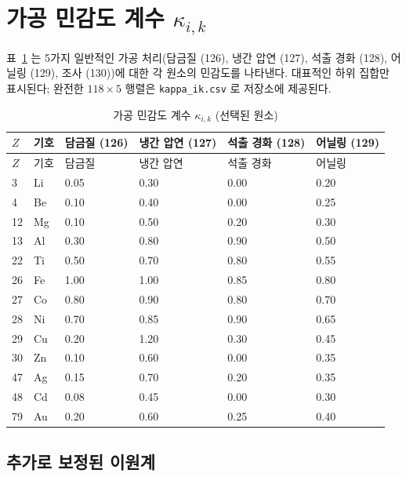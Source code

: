 \documentclass[12pt,a4paper]{article}
\begin{document}
	\section{가공 민감도 계수 $\kappa_{i,k}$}
	표~\ref{tab:kappa_ik} 는 5가지 일반적인 가공 처리(담금질 (126), 냉간 압연 (127), 석출 경화 (128), 어닐링 (129), 조사 (130))에 대한 각 원소의 민감도를 나타낸다. 대표적인 하위 집합만 표시된다; 완전한 $118\times5$ 행렬은 \texttt{kappa\_ik.csv} 로 저장소에 제공된다.
	
	\begin{longtable}{p{1.8cm} p{1.2cm} p{1.2cm} p{1.2cm} p{1.2cm} p{1.2cm}}
		\caption{가공 민감도 계수 $\kappa_{i,k}$ (선택된 원소)}\label{tab:kappa_ik}\\
		\toprule
		$Z$ & 기호 & 담금질 (126) & 냉간 압연 (127) & 석출 경화 (128) & 어닐링 (129) \\
		\midrule
		\endfirsthead
		\toprule
		$Z$ & 기호 & 담금질 & 냉간 압연 & 석출 경화 & 어닐링 \\
		\midrule
		\endhead
		3  & Li  & 0.05 & 0.30 & 0.00 & 0.20 \\
		4  & Be  & 0.10 & 0.40 & 0.00 & 0.25 \\
		12 & Mg  & 0.10 & 0.50 & 0.20 & 0.30 \\
		13 & Al  & 0.30 & 0.80 & 0.90 & 0.50 \\
		22 & Ti  & 0.50 & 0.70 & 0.80 & 0.55 \\
		26 & Fe  & 1.00 & 1.00 & 0.85 & 0.80 \\
		27 & Co  & 0.80 & 0.90 & 0.80 & 0.70 \\
		28 & Ni  & 0.70 & 0.85 & 0.90 & 0.65 \\
		29 & Cu  & 0.20 & 1.20 & 0.30 & 0.45 \\
		30 & Zn  & 0.10 & 0.60 & 0.00 & 0.35 \\
		47 & Ag  & 0.15 & 0.70 & 0.20 & 0.35 \\
		48 & Cd  & 0.08 & 0.45 & 0.00 & 0.30 \\
		79 & Au  & 0.20 & 0.60 & 0.25 & 0.40 \\
		\bottomrule
	\end{longtable}
	
	
	\subsection*{추가로 보정된 이원계}
	
\end{document}
